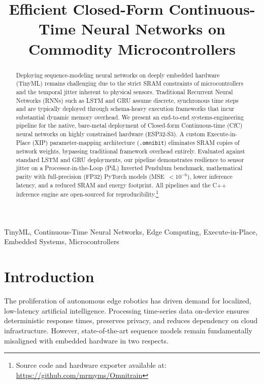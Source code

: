 \documentclass[conference]{IEEEtran}
\begin{document}
\title{Efficient Closed-Form Continuous-Time Neural Networks on Commodity Microcontrollers}

\author{
}

\maketitle

\begin{abstract}
Deploying sequence-modeling neural networks on deeply embedded hardware (TinyML) remains challenging due to the strict SRAM constraints of microcontrollers and the temporal jitter inherent to physical sensors. Traditional Recurrent Neural Networks (RNNs) such as LSTM and GRU assume discrete, synchronous time steps and are typically deployed through schema-heavy execution frameworks that incur substantial dynamic memory overhead. We present an end-to-end systems-engineering pipeline for the native, bare-metal deployment of Closed-form Continuous-time (CfC) neural networks on highly constrained hardware (ESP32-S3). A custom Execute-in-Place (XIP) parameter-mapping architecture (\texttt{.omnibit}) eliminates SRAM copies of network weights, bypassing traditional framework overhead entirely. Evaluated against standard LSTM and GRU deployments, our pipeline demonstrates resilience to sensor jitter on a Processor-in-the-Loop (PiL) Inverted Pendulum benchmark, mathematical parity with full-precision (FP32) PyTorch models (MSE~$<10^{-6}$), lower inference latency, and a reduced SRAM and energy footprint. All pipelines and the C++ inference engine are open-sourced for reproducibility.\footnote{Source code and hardware exporter available at: \url{https://github.com/mrmyms/Omnitrain}}
\end{abstract}

\begin{IEEEkeywords}
TinyML, Continuous-Time Neural Networks, Edge Computing, Execute-in-Place, Embedded Systems, Microcontrollers
\end{IEEEkeywords}

\section{Introduction}
The proliferation of autonomous edge robotics has driven demand for localized, low-latency artificial intelligence. Processing time-series data on-device ensures deterministic response times, preserves privacy, and reduces dependency on cloud infrastructure. However, state-of-the-art sequence models remain fundamentally misaligned with embedded hardware in two respects.
\end{document}
